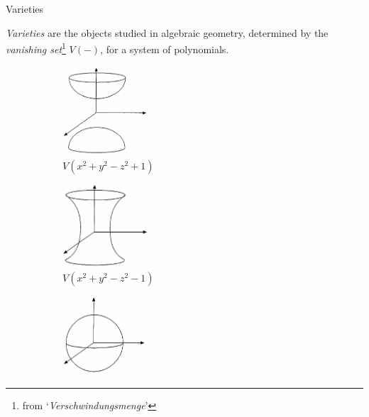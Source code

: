 \begin{frame}{Varieties}
    
    \emph{Varieties} are the objects studied in algebraic geometry, determined by the \emph{vanishing set}\footnote{from `\emph{Verschwindungsmenge}'} $V(-)$, for a system of polynomials.

    \begin{figure}
        \centering
        \begin{subfigure}[b]{0.475\textwidth}
            \centering
            \includegraphics[width=0.35\textwidth]{resources/two-hyperboloid}
            \caption[]%
            {{\small $V(x^{2} + y^{2} - z^{2} + 1)$}}    
        \end{subfigure}
        \hfill
        \begin{subfigure}[b]{0.475\textwidth}  
            \centering 
            \includegraphics[width=0.35\textwidth]{resources/one-hyperboloid}
            \caption[]%
            {{\small $V(x^{2} + y^{2} - z^{2} - 1)$}}    
        \end{subfigure}
        \hfill
        \begin{subfigure}[b]{0.475\textwidth}   
            \centering 
            \includegraphics[width=0.35\textwidth]{resources/sphere}

\end{subfigure}
\end{figure}
\end{frame}
